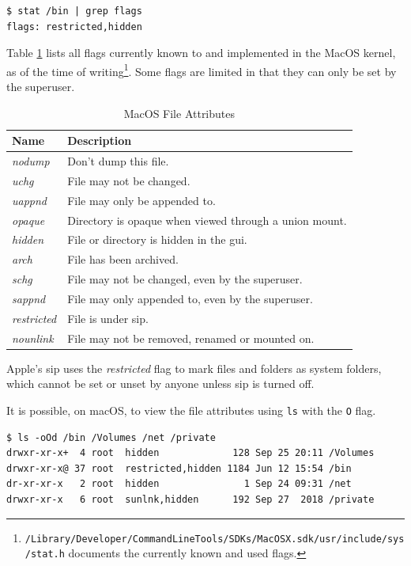 \documentclass[a4paper]{article}
\begin{document}
\begin{verbatim}
$ stat /bin | grep flags
flags: restricted,hidden
\end{verbatim}
Table \ref{tbl:macosflags} lists all flags currently known to and implemented in the MacOS kernel, as of the time of writing\footnote{\texttt{/Library/Developer/CommandLineTools/SDKs/MacOSX.sdk/usr/include/sys/stat.h} documents the currently known and used flags.}. Some flags are limited in that they can only be set by the superuser. 
\begin{table}
\centering\caption{MacOS File Attributes}\label{tbl:macosflags}
\begin{tabular}{@{}lp{10.5cm}@{}}
\toprule
Name & Description\\
\midrule
\emph{nodump} & Don't dump this file.\\
\emph{uchg} & File may not be changed.\\
\emph{uappnd} & File may only be appended to.\\
\emph{opaque} & Directory is opaque when viewed through a union mount.\\
\emph{hidden} & File or directory is hidden in the \gls{gui}.\\
\emph{arch} & File has been archived.\\
\emph{schg} & File may not be changed, even by the superuser.\\
\emph{sappnd} & File may only appended to, even by the superuser.\\
\emph{restricted} & File is under \gls{sip}.\\
\emph{nounlink} & File may not be removed, renamed or mounted on.\\
\bottomrule  
\end{tabular}
\end{table}

Apple's \gls{sip} uses the \emph{restricted} flag to mark files and folders as system folders, which cannot be set or unset by anyone unless \gls{sip} is turned off.

It is possible, on macOS, to view the file attributes using \verb|ls| with the \verb|O| flag. 

\begin{verbatim}
$ ls -oOd /bin /Volumes /net /private
drwxr-xr-x+  4 root  hidden             128 Sep 25 20:11 /Volumes
drwxr-xr-x@ 37 root  restricted,hidden 1184 Jun 12 15:54 /bin
dr-xr-xr-x   2 root  hidden               1 Sep 24 09:31 /net
drwxr-xr-x   6 root  sunlnk,hidden      192 Sep 27  2018 /private  
\end{verbatim}
\end{document}
